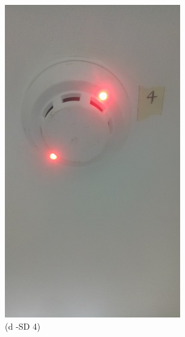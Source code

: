 \begin{figure}
\begin{minipage}[b]{0.25\linewidth}
	\includegraphics[width=\textwidth]{figures/R1P_fdas/SD4.jpg}
	\caption*{(d -SD 4)}
\end{minipage}
	\hspace{0.05cm}
\begin{minipage}[b]{0.25\linewidth}
	\centering

\end{minipage}
\end{figure}
